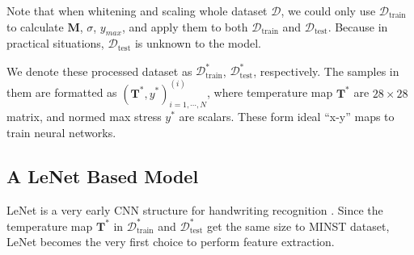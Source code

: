 Note that when whitening and scaling whole dataset $\mathcal{D}$, we could only use
$\mathcal{D}_{\textrm{train}}$ to calculate $\mathbf{M}$, $\sigma$, $y_{max}$, and apply them
to both $\mathcal{D}_{\textrm{train}}$ and $\mathcal{D}_{\textrm{test}}$. Because in practical situations,
$\mathcal{D}_{\textrm{test}}$ is unknown to the model.

We denote these processed dataset as $\mathcal{D}_{\textrm{train}}^*$, $\mathcal{D}_{\textrm{test}}^*$, respectively.
The samples in them are formatted as $\left(\mathbf{T}^*, y^*\right)^{(i)}_{i=1,\cdots, N}$,
where temperature map $\mathbf{T}^*$ are $28 \times 28$ matrix, and normed max stress $y ^ *$ are scalars.
These form ideal ``x-y'' maps to train neural networks.

\subsection{A LeNet Based Model} \label{sec::lenet}
LeNet is a very early CNN structure for handwriting recognition \cite{lecun1998gradient}. Since the temperature map
$\mathbf{T}^*$ in $\mathcal{D}_{\textrm{train}}^*$ and $\mathcal{D}_{\textrm{test}}^*$ get the same size to MINST dataset,
LeNet becomes the very first choice to perform feature extraction. 

